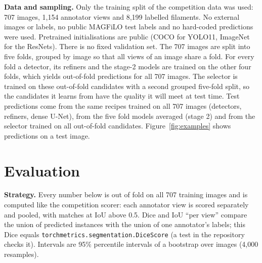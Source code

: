 \documentclass[sigconf]{acmart}
\begin{document}
\textbf{Data and sampling.} Only the training split of the competition data was used: 707 images, 1,154 annotator views and 8,199 labelled filaments. No external images or labels, no public MAGFiLO test labels and no hard-coded predictions were used. Pretrained initialisations are public (COCO for YOLO11, ImageNet for the ResNets). There is no fixed validation set. The 707 images are split into five folds, grouped by image so that all views of an image share a fold. For every fold a detector, its refiners and the stage-2 models are trained on the other four folds, which yields out-of-fold predictions for all 707 images. The selector is trained on these out-of-fold candidates with a second grouped five-fold split, so the candidates it learns from have the quality it will meet at test time. Test predictions come from the same recipes trained on all 707 images (detectors, refiners, dense U-Net), from the five fold models averaged (stage 2) and from the selector trained on all out-of-fold candidates. Figure~\ref{fig:examples} shows predictions on a test image.

\section{Evaluation}\label{sec:evaluation}
\textbf{Strategy.} Every number below is out of fold on all 707 training images and is computed like the competition scorer: each annotator view is scored separately and pooled, with matches at IoU above 0.5. Dice and IoU ``per view'' compare the union of predicted instances with the union of one annotator's labels; this Dice equals \texttt{torchmetrics.segmentation.DiceScore} (a test in the repository checks it). Intervals are 95\% percentile intervals of a bootstrap over images (4,000 resamples).
\end{document}
